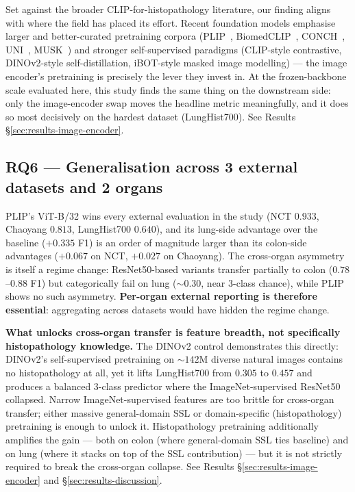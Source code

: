 Set against the broader CLIP-for-histopathology literature, our finding aligns with where the field has placed its effort. Recent foundation models emphasise larger and better-curated pretraining corpora (PLIP~\cite{huang2023plip}, BiomedCLIP~\cite{zhang2023biomedclip}, CONCH~\cite{lu2024conch}, UNI~\cite{chen2024uni}, MUSK~\cite{xiang2025musk}) and stronger self-supervised paradigms (CLIP-style contrastive, DINOv2-style self-distillation, iBOT-style masked image modelling) --- the image encoder's pretraining is precisely the lever they invest in. At the frozen-backbone scale evaluated here, this study finds the same thing on the downstream side: only the image-encoder swap moves the headline metric meaningfully, and it does so most decisively on the hardest dataset (LungHist700). See Results §\ref{sec:results-image-encoder}.

\subsection*{RQ6 --- Generalisation across 3 external datasets and 2 organs}

PLIP's ViT-B/32 wins every external evaluation in the study (NCT $0.933$, Chaoyang $0.813$, LungHist700 $0.640$), and its lung-side advantage over the baseline ($+0.335$ F1) is an order of magnitude larger than its colon-side advantages ($+0.067$ on NCT, $+0.027$ on Chaoyang). The cross-organ asymmetry is itself a regime change: ResNet50-based variants transfer partially to colon ($0.78$--$0.88$ F1) but categorically fail on lung ($\sim 0.30$, near 3-class chance), while PLIP shows no such asymmetry. \textbf{Per-organ external reporting is therefore essential}: aggregating across datasets would have hidden the regime change.

\textbf{What unlocks cross-organ transfer is feature breadth, not specifically histopathology knowledge.} The DINOv2 control demonstrates this directly: DINOv2's self-supervised pretraining on $\sim 142$M diverse natural images contains no histopathology at all, yet it lifts LungHist700 from $0.305$ to $0.457$ and produces a balanced 3-class predictor where the ImageNet-supervised ResNet50 collapsed. Narrow ImageNet-supervised features are too brittle for cross-organ transfer; either massive general-domain SSL or domain-specific (histopathology) pretraining is enough to unlock it. Histopathology pretraining additionally amplifies the gain --- both on colon (where general-domain SSL ties baseline) and on lung (where it stacks on top of the SSL contribution) --- but it is not strictly required to break the cross-organ collapse. See Results §\ref{sec:results-image-encoder} and §\ref{sec:results-discussion}.

